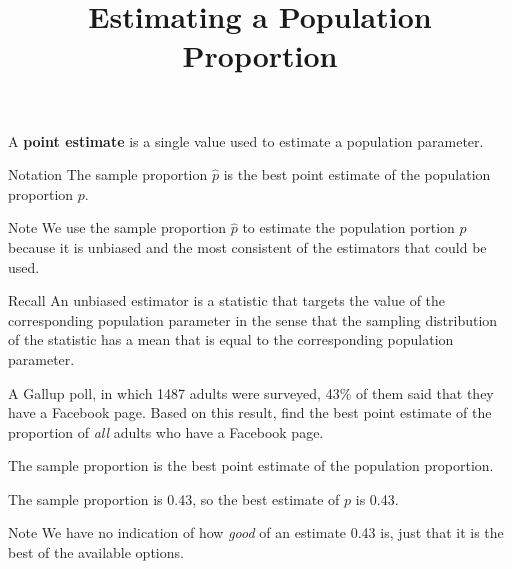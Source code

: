 \documentclass{beamer}
\title[MA205 - Section 6.1]{Estimating a Population Proportion}
\begin{document}
\begin{frame}
\titlepage
\end{frame}

\begin{frame}
\begin{definition}
A \textbf{point estimate} is a single value used to estimate a population parameter.
\end{definition}\pause

\begin{block}{Notation}
The sample proportion $\hat{p}$ is the best point estimate of the population proportion $p$.
\end{block}\pause

\begin{block}{Note}
We use the sample proportion $\hat{p}$ to estimate the population portion $p$ because it is unbiased and the most consistent of the estimators that could be used.
\end{block}\pause

\begin{block}{Recall}
An unbiased estimator is a statistic that targets the value of the corresponding population parameter in the sense that the sampling distribution of the statistic has a mean that is equal to the corresponding population parameter.
\end{block}
\end{frame}

\begin{frame}
\begin{example}
A Gallup poll, in which 1487 adults were surveyed, 43\% of them said that they have a Facebook page. Based on this result, find the best point estimate of the proportion of \emph{all} adults who have a Facebook page.\pause

\vspace{2mm}
The sample proportion is the best point estimate of the population proportion.\pause

\vspace{2mm}
The sample proportion is 0.43, so the best estimate of $p$ is 0.43.
\end{example}\pause

\begin{block}{Note}
We have no indication of how \emph{good} of an estimate 0.43 is, just that it is the best of the available options.
\end{block}
\end{frame}
\end{document}
